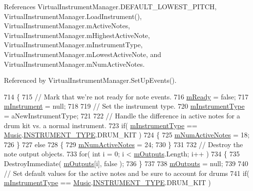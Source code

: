 References Virtual\+Instrument\+Manager.\+D\+E\+F\+A\+U\+L\+T\+\_\+\+L\+O\+W\+E\+S\+T\+\_\+\+P\+I\+T\+CH, Virtual\+Instrument\+Manager.\+Load\+Instrument(), Virtual\+Instrument\+Manager.\+m\+Active\+Notes, Virtual\+Instrument\+Manager.\+m\+Highest\+Active\+Note, Virtual\+Instrument\+Manager.\+m\+Instrument\+Type, Virtual\+Instrument\+Manager.\+m\+Lowest\+Active\+Note, and Virtual\+Instrument\+Manager.\+m\+Num\+Active\+Notes.



Referenced by Virtual\+Instrument\+Manager.\+Set\+Up\+Events().


\begin{DoxyCode}
714     \{
715         \textcolor{comment}{// Mark that we're not ready for note events.}
716         \hyperlink{group___v_i_m_priv_ga983a11920bf16794735cc193c327ac42}{mReady} = \textcolor{keyword}{false};
717         \hyperlink{group___v_i_m_priv_gaed435d1f9be09864846db4322dc21fd1}{mInstrument} = null;
718 
719         \textcolor{comment}{// Set the instrument type.}
720         \hyperlink{group___v_i_m_priv_ga108c350257b3a2080e06cd4a8251f6a4}{mInstrumentType} = aNewInstrumentType;
721 
722         \textcolor{comment}{// Handle the difference in active notes for a drum kit vs. a normal instrument.}
723         \textcolor{keywordflow}{if}( \hyperlink{group___v_i_m_priv_ga108c350257b3a2080e06cd4a8251f6a4}{mInstrumentType} == \hyperlink{class_music}{Music}.\hyperlink{group___music_enums_gabfce60192305965558a36e368ebd67c3}{INSTRUMENT\_TYPE}.DRUM\_KIT )
724         \{
725             \hyperlink{group___v_i_m_priv_ga0f7e11945763c48057be326b661dfdaf}{mNumActiveNotes} = 18;
726         \}
727         \textcolor{keywordflow}{else}
728         \{
729             \hyperlink{group___v_i_m_priv_ga0f7e11945763c48057be326b661dfdaf}{mNumActiveNotes} = 24;
730         \}
731 
732         \textcolor{comment}{// Destroy the note output objects.}
733         \textcolor{keywordflow}{for}( \textcolor{keywordtype}{int} i = 0; i < \hyperlink{group___v_i_m_priv_ga53f837fd01475fa35629a650e7fa00e3}{mOutputs}.Length; i++ )
734         \{
735             DestroyImmediate( \hyperlink{group___v_i_m_priv_ga53f837fd01475fa35629a650e7fa00e3}{mOutputs}[i], \textcolor{keyword}{false} );
736         \}
737 
738         \hyperlink{group___v_i_m_priv_ga53f837fd01475fa35629a650e7fa00e3}{mOutputs} = null;
739 
740         \textcolor{comment}{// Set default values for the active notes and be sure to account for drums}
741         \textcolor{keywordflow}{if}( \hyperlink{group___v_i_m_priv_ga108c350257b3a2080e06cd4a8251f6a4}{mInstrumentType} == \hyperlink{class_music}{Music}.\hyperlink{group___music_enums_gabfce60192305965558a36e368ebd67c3}{INSTRUMENT\_TYPE}.DRUM\_KIT )

\end{DoxyCode}
